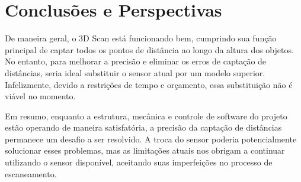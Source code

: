 
\chapter{Conclusões e Perspectivas}\label{cap:conclusoeseperspectivas}

De maneira geral, o 3D Scan está funcionando bem, cumprindo sua função principal de captar todos os pontos de distância ao longo da altura dos objetos. No entanto, para melhorar a precisão e eliminar os erros de captação de distâncias, seria ideal substituir o sensor atual por um modelo superior. Infelizmente, devido a restrições de tempo e orçamento, essa substituição não é viável no momento.

Em resumo, enquanto a estrutura, mecânica e controle de software do projeto estão operando de maneira satisfatória, a precisão da captação de distâncias permanece um desafio a ser resolvido. A troca do sensor poderia potencialmente solucionar esses problemas, mas as limitações atuais nos obrigam a continuar utilizando o sensor disponível, aceitando suas imperfeições no processo de escaneamento.